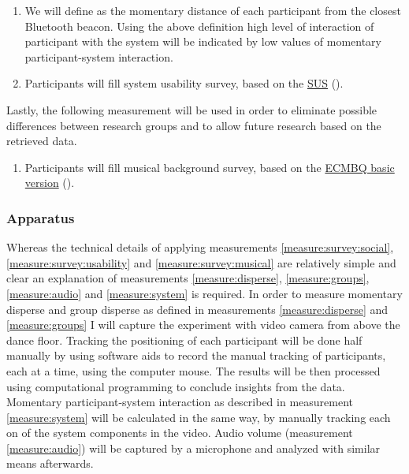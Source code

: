 \begin{enumerate}[resume]
	\item \label{measure:system} We will define  as the momentary distance of each participant from the closest Bluetooth beacon. Using the above definition high level of interaction of participant with the system will be indicated by low values of momentary participant-system interaction.
	\item \label{measure:survey:usability} Participants will fill system usability survey, based on the \href{http://en.wikipedia.org/wiki/System_usability_scale}{SUS} ().
\end{enumerate}
Lastly, the following measurement will be used in order to eliminate possible differences between research groups and to allow future research based on the retrieved data.
\begin{enumerate}[resume]
	\item \label{measure:survey:musical} Participants will fill musical background survey, based on the \href{sites.google.com/site/ecmbqzhao1/simple%20questionnaire.pdf}{ECMBQ basic version} (\todo{finish ref}).
\end{enumerate}

\subsubsection{Apparatus}

Whereas the technical details of applying measurements \ref{measure:survey:social}, \ref{measure:survey:usability} and \ref{measure:survey:musical} are relatively simple and clear an explanation of measurements \ref{measure:disperse}, \ref{measure:groups}, \ref{measure:audio} and \ref{measure:system} is required.
In order to measure momentary disperse and group disperse as defined in measurements \ref{measure:disperse} and \ref{measure:groups} I will capture the experiment with video camera from above the dance floor. Tracking the positioning of each participant will be done half manually by using software aids to record the manual tracking of participants, each at a time, using the computer mouse. The results will be then processed using computational programming to conclude insights from the data.
Momentary participant-system interaction as described in measurement \ref{measure:system} will be calculated in the same way, by manually tracking each on of the system components in the video.
Audio volume (measurement \ref{measure:audio}) will be captured by a microphone and analyzed with similar means afterwards.

